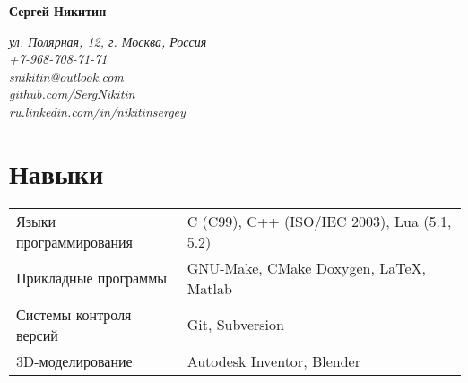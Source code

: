 \documentclass[a4paper, 11pt]{article}
\begin{document}
{\LARGE\textbf{Сергей Никитин}}

\begin{flushright}
    {\itshape
        ул. Полярная, 12, г. Москва, Россия                                                 \\
        +7-968-708-71-71                                                                    \\
        \href{mailto:snikitin@outlook.com}{snikitin@outlook.com}                            \\
        \href{https://github.com/SergNikitin}{github.com/SergNikitin}                       \\
        \href{http://ru.linkedin.com/in/nikitinsergey}{ru.linkedin.com/in/nikitinsergey}    \\
    }
\end{flushright}

\section{Навыки}
\begin{tabular}{ll}
    Языки программирования   & C (C99), C++ (ISO/IEC 2003), Lua (5.1, 5.2)  \\
    Прикладные программы     & GNU-Make, CMake Doxygen, LaTeX, Matlab       \\
    Системы контроля версий  & Git, Subversion                              \\
    3D-моделирование         & Autodesk Inventor, Blender
\end{tabular}
\end{document}
